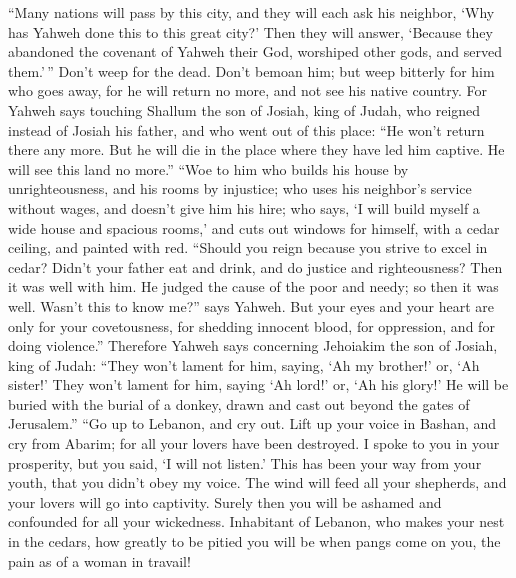  ``Many nations will pass by this city, and they will each
ask his neighbor, `Why has Yahweh done this to this great city?'
 Then they will answer, `Because they abandoned the covenant
of Yahweh their God, worshiped other gods, and served them.'\,''
 Don't weep for the dead. Don't bemoan him; but weep
bitterly for him who goes away, for he will return no more, and not see
his native country.  For Yahweh says touching Shallum the
son of Josiah, king of Judah, who reigned instead of Josiah his father,
and who went out of this place: ``He won't return there any more.
 But he will die in the place where they have led him
captive. He will see this land no more.''  ``Woe to him who
builds his house by unrighteousness, and his rooms by injustice; who
uses his neighbor's service without wages, and doesn't give him his
hire;  who says, `I will build myself a wide house and
spacious rooms,' and cuts out windows for himself, with a cedar ceiling,
and painted with red.  ``Should you reign because you
strive to excel in cedar? Didn't your father eat and drink, and do
justice and righteousness? Then it was well with him.  He
judged the cause of the poor and needy; so then it was well. Wasn't this
to know me?'' says Yahweh.  But your eyes and your heart
are only for your covetousness, for shedding innocent blood, for
oppression, and for doing violence.''  Therefore Yahweh
says concerning Jehoiakim the son of Josiah, king of Judah: ``They won't
lament for him, saying, `Ah my brother!' or, `Ah sister!' They won't
lament for him, saying `Ah lord!' or, `Ah his glory!'  He
will be buried with the burial of a donkey, drawn and cast out beyond
the gates of Jerusalem.''  ``Go up to Lebanon, and cry out.
Lift up your voice in Bashan, and cry from Abarim; for all your lovers
have been destroyed.  I spoke to you in your prosperity,
but you said, `I will not listen.' This has been your way from your
youth, that you didn't obey my voice.  The wind will feed
all your shepherds, and your lovers will go into captivity. Surely then
you will be ashamed and confounded for all your wickedness.
 Inhabitant of Lebanon, who makes your nest in the cedars,
how greatly to be pitied you will be when pangs come on you, the pain as
of a woman in travail!

